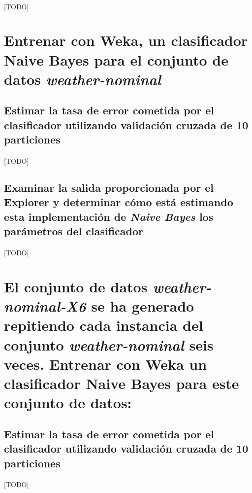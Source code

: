 \documentclass{article}
\begin{document}
		\paragraph{}
		[TODO]

	\section{Entrenar con Weka, un clasificador Naive Bayes para el conjunto de datos \emph{weather-nominal}}
	\label{sec:e5}

		\subsection{Estimar la tasa de error cometida por el clasificador utilizando validación cruzada de 10 particiones}

			\paragraph{}
			[TODO]

		\subsection{Examinar la salida proporcionada por el Explorer y determinar cómo está estimando esta implementación de \emph{Naive Bayes} los parámetros del clasificador}

			\paragraph{}
			[TODO]

	\section{El conjunto de datos \emph{weather-nominal-X6} se ha generado repitiendo cada instancia del conjunto \emph{weather-nominal} seis veces. Entrenar con Weka un clasificador Naive Bayes para este conjunto de datos:}
	\label{sec:e6}

		\subsection{Estimar la tasa de error cometida por el clasificador utilizando validación cruzada de 10 particiones}

			\paragraph{}
			[TODO]
\end{document}
